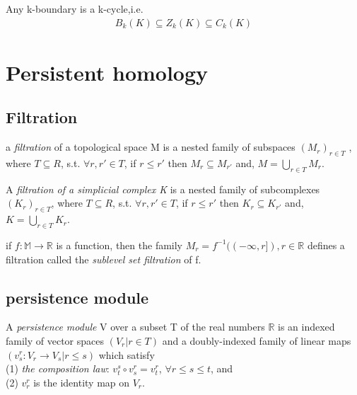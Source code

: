 \begin{corollary}
Any k-boundary is a k-cycle,i.e.
\begin{align*}
    B_k(K) \subseteq Z_k(K) \subseteq C_k(K)
\end{align*}
\end{corollary}

\section{Persistent homology}
\subsection{Filtration}
\begin{definition}
a \textit{filtration} of a topological space M is a nested family of subspaces $(M_r)_{r \in T}$ , where $T \subseteq R$, s.t. $\forall r, r' \in T$, if $r \leq r'$ then $M_r \subseteq M_{r'}$ and, $M = \bigcup_{r \in T}M_r$.
\end{definition}

\begin{example}
A \textit{filtration of a simplicial complex K} is a nested family of subcomplexes $(K_r)_{r \in T}$, where $T \subseteq R$, s.t. $\forall r, r' \in T$, if $r \leq r'$ then $K_r \subseteq K_{r'}$ and, $K = \bigcup_{r \in T}K_r$.
\end{example}
\begin{example}
if $f : \mathbb{M} \rightarrow \mathbb{R}$ is a function, then the family $M_r = f^{-1}((-\infty, r]), r \in \mathbb{R}$ defines a filtration called the \textit{sublevel set filtration} of f.
\end{example}

\subsection{persistence module}
\begin{definition}
A \textit{persistence module} V over a subset T of the real numbers $\mathbb{R}$ is an indexed family of vector spaces $(V_r |  r \in T)$ and a doubly-indexed family of linear maps $(v_s^r : V_r \rightarrow V_s | r \leq s)$ which satisfy\\
(1) \textit{the composition law}: $v^s_t \circ v^r_s = v^r_t$, $\forall r \leq s \leq t$, and\\
(2) $v^r_r$ is the identity map on $V_r$.
\end{definition}

